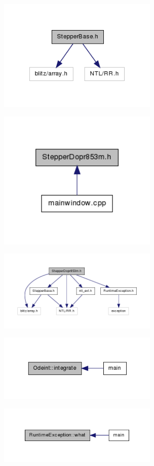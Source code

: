 \includegraphics[width=3in]{figures/_stepper_base_8h__incl.png}

\includegraphics[width=3in]{figures/_stepper_dopr853m_8h__dep__incl.png}

\includegraphics[width=3in]{figures/_stepper_dopr853m_8h__incl.png}

\includegraphics[width=3in]{figures/class_odeint_a998c158bc0c3e531cd5b1960cddfa3d0_icgraph.png}

\includegraphics[width=3in]{figures/class_runtime_exception_a99f49b8c4fcb10963596bc0e8507e47e_icgraph.png}

